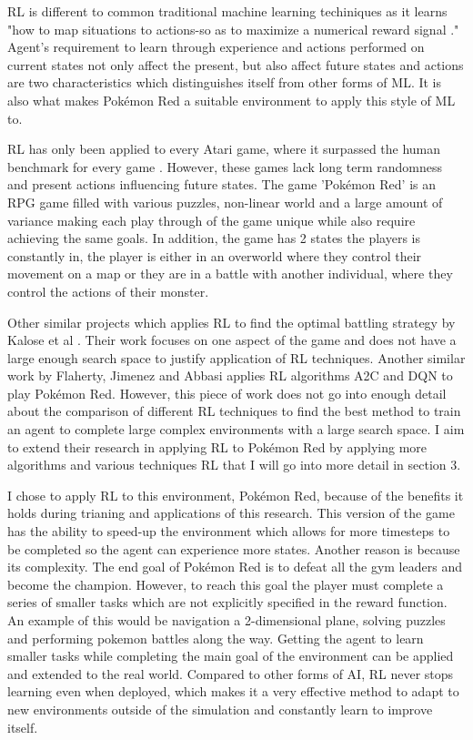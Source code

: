 \documentclass{surrey_disso_style}
\begin{document}
RL is different to common traditional machine learning techiniques as it learns "how to map situations to actions-so as to maximize 
a numerical reward signal \cite{Sutton1}." Agent's requirement to learn through experience and actions performed on current states 
not only affect the present, but also affect future states and actions are two characteristics which distinguishes itself from other 
forms of ML. It is also what makes Pokémon Red a suitable environment to apply this style of ML to. 
\par

RL has only been applied to every Atari game, where it surpassed the human benchmark for every game \cite{brockman2016openai}. 
However, these games lack long term randomness and present actions influencing future states. The game 'Pokémon Red' is an RPG game 
filled with various puzzles, non-linear world and a large amount of variance making each play through of the game unique while also 
require achieving the same goals. In addition, the game has 2 states the players is constantly in, the player is either in an 
overworld where they control their movement on a map or they are in a battle with another individual, where they control the actions 
of their monster.
\par

Other similar projects which applies RL to find the optimal battling strategy by Kalose et al \cite{kalose2018optimal}. 
Their work focuses on one aspect of the game and does not have a large enough search space to justify application of RL techniques. 
Another similar work by Flaherty, Jimenez and Abbasi \cite{flaherty2021playing} applies RL algorithms A2C and DQN to play Pokémon 
Red. However, this piece of work does not go into enough detail about the comparison of different RL techniques to find the best
 method to train an agent to complete large complex environments with a large search space. I aim to extend their research in 
 applying RL to Pokémon Red by applying more algorithms and various techniques RL that I will go into more detail in section 3.
\par

I chose to apply RL to this environment, Pokémon Red, because of the benefits it holds during trianing and applications of this 
research. This version of the game has the ability to speed-up the environment which allows for more timesteps to be completed 
so the agent can experience more states. Another reason is because its complexity. The end goal of Pokémon Red is to defeat all the 
gym leaders and become the champion. However, to reach this goal the player must complete a series of smaller tasks which are not 
explicitly specified in the reward function. An example of this would be navigation a 2-dimensional plane, solving puzzles and
 performing pokemon battles along the way. Getting the agent to learn smaller tasks while completing the main goal of the environment 
 can be applied and extended to the real world. Compared to other forms of AI, RL never stops learning even when deployed, which makes
 it a very effective method to adapt to new environments outside of the simulation and constantly learn to improve itself. 
\end{document}

